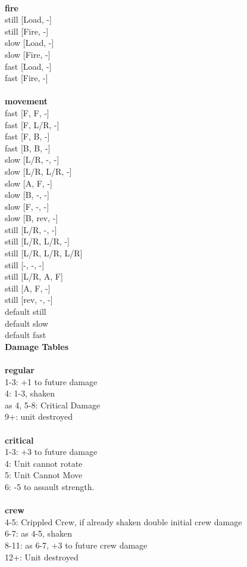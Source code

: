 \ \\ {\bf fire } \\
still [Load, -] \\
still [Fire, -] \\
slow [Load, -] \\
slow [Fire, -] \\
fast [Load, -] \\
fast [Fire, -] \\
\ \\ {\bf movement } \\
fast [F, F, -] \\
fast [F, L/R, -] \\
fast [F, B, -] \\
fast [B, B, -] \\
slow [L/R, -, -] \\
slow [L/R, L/R, -] \\
slow [A, F, -] \\
slow [B, -, -] \\
slow [F, -, -] \\
slow [B, rev, -] \\
still [L/R, -, -] \\
still [L/R, L/R, -] \\
still [L/R, L/R, L/R] \\
still [-, -, -] \\
still [L/R, A, F] \\
still [A, F, -] \\
still [rev, -, -] \\
default still \\
default slow \\
default fast \\


{\bf Damage Tables} \\
\ \\ {\bf regular } \\
1-3: +1 to future damage \\
4: 1-3, shaken \\
as 4, 5-8: Critical Damage \\
9+: unit destroyed \\
\ \\ {\bf critical } \\
1-3: +3 to future damage \\
4: Unit cannot rotate \\
5: Unit Cannot Move \\
6: -5 to assault strength. \\
\ \\ {\bf crew } \\
4-5: Crippled Crew, if already shaken double initial crew damage \\
6-7: as 4-5, shaken \\
8-11: as 6-7, +3 to future crew damage \\
12+: Unit destroyed \\


